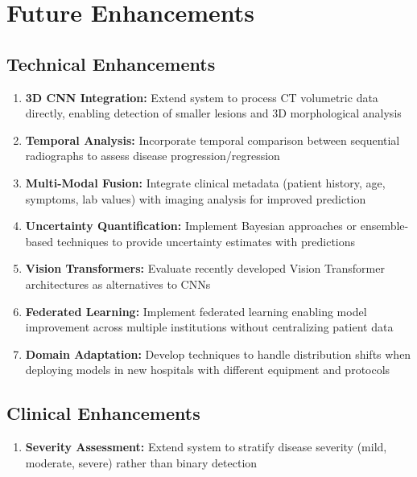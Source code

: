 {\section{Future Enhancements}

\subsection{Technical Enhancements}

\begin{enumerate}
    \item \textbf{3D CNN Integration:} Extend system to process CT volumetric data directly, enabling detection of smaller lesions and 3D morphological analysis
    
    \item \textbf{Temporal Analysis:} Incorporate temporal comparison between sequential radiographs to assess disease progression/regression
    
    \item \textbf{Multi-Modal Fusion:} Integrate clinical metadata (patient history, age, symptoms, lab values) with imaging analysis for improved prediction
    
    \item \textbf{Uncertainty Quantification:} Implement Bayesian approaches or ensemble-based techniques to provide uncertainty estimates with predictions
    
    \item \textbf{Vision Transformers:} Evaluate recently developed Vision Transformer architectures as alternatives to CNNs
    
    \item \textbf{Federated Learning:} Implement federated learning enabling model improvement across multiple institutions without centralizing patient data
    
    \item \textbf{Domain Adaptation:} Develop techniques to handle distribution shifts when deploying models in new hospitals with different equipment and protocols
\end{enumerate}

\subsection{Clinical Enhancements}

\begin{enumerate}
    \item \textbf{Severity Assessment:} Extend system to stratify disease severity (mild, moderate, severe) rather than binary detection
    

\end{enumerate}}
